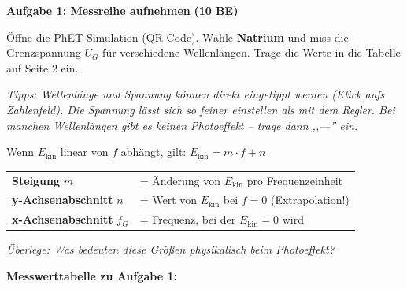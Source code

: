 \documentclass[11pt,a4paper]{article}
\begin{document}
\vspace{0.5em}


\textbf{Aufgabe 1: Messreihe aufnehmen} \hfill \textbf{(10 BE)}

Öffne die PhET-Simulation (QR-Code). Wähle \textbf{Natrium} und miss die Grenzspannung $U_G$ für verschiedene Wellenlängen. Trage die Werte in die Tabelle auf Seite 2 ein.

\textit{Tipps: Wellenlänge und Spannung können direkt eingetippt werden (Klick aufs Zahlenfeld). Die Spannung lässt sich so feiner einstellen als mit dem Regler. Bei manchen Wellenlängen gibt es keinen Photoeffekt -- trage dann ,,---'' ein.}

\vspace{0.8em}


\begin{tcolorbox}[merkbox={Vorüberlegung: Was verrät uns eine Gerade?}]
Wenn $E_{\text{kin}}$ linear von $f$ abhängt, gilt: \quad $E_{\text{kin}} = m \cdot f + n$

\vspace{0.3em}
\begin{tabular}{@{}ll@{}}
\textbf{Steigung} $m$ & = Änderung von $E_{\text{kin}}$ pro Frequenzeinheit \\
\textbf{y-Achsenabschnitt} $n$ & = Wert von $E_{\text{kin}}$ bei $f = 0$ (Extrapolation!) \\
\textbf{x-Achsenabschnitt} $f_G$ & = Frequenz, bei der $E_{\text{kin}} = 0$ wird \\
\end{tabular}

\vspace{0.3em}
\textit{Überlege: Was bedeuten diese Größen physikalisch beim Photoeffekt?}
\end{tcolorbox}

\newpage


\textbf{Messwerttabelle zu Aufgabe 1:}

\vspace{0.3em}
\end{document}
